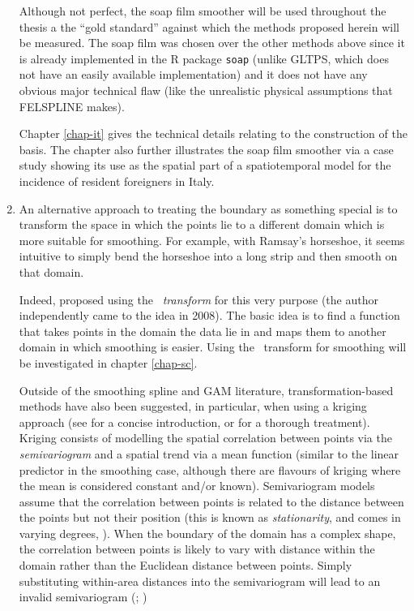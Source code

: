 \begin{enumerate}
Although not perfect, the soap film smoother will be used throughout the thesis a the ``gold standard'' against which the methods proposed herein will be measured. The soap film was chosen over the other methods above since it is already implemented in the \textsf{R} package \texttt{soap} (unlike GLTPS, which does not have an easily available implementation) and it does not have any obvious major technical flaw (like the unrealistic physical assumptions that FELSPLINE makes).

Chapter \ref{chap-it} gives the technical details relating to the construction of the basis. The chapter also further illustrates the soap film smoother via a case study showing its use as the spatial part of a spatiotemporal model for the incidence of resident foreigners in Italy. 

\item An alternative approach to treating the boundary as something special is to transform the space in which the points lie to a different domain which is more suitable for smoothing. For example, with Ramsay's horseshoe, it seems intuitive to simply bend the horseshoe into a long strip and then smooth on that domain.

Indeed,  proposed using the \textit{\sch\ transform} for this very purpose (the author independently came to the idea in 2008). The basic idea is to find a function that takes points in the domain the data lie in and maps them to another domain in which smoothing is easier. Using the \sch\ transform for smoothing will be investigated in chapter \ref{chap-sc}.

Outside of the smoothing spline and GAM literature, transformation-based methods have also been suggested, in particular, when using a kriging approach (see  for a concise introduction,  or  for a thorough treatment). Kriging consists of modelling the spatial correlation between points via the \textit{semivariogram} and a spatial trend via a mean function (similar to the linear predictor in the smoothing case, although there are flavours of kriging where the mean is considered constant and/or known). Semivariogram models assume that the correlation between points is related to the distance between the points but not their position (this is known as \textit{stationarity}, and comes in varying degrees, ). When the boundary of the domain has a complex shape, the correlation between points is likely to vary with distance within the domain rather than the Euclidean distance between points. Simply substituting within-area distances into the semivariogram will lead to an invalid semivariogram (; \cite{curriero})


\end{enumerate}
